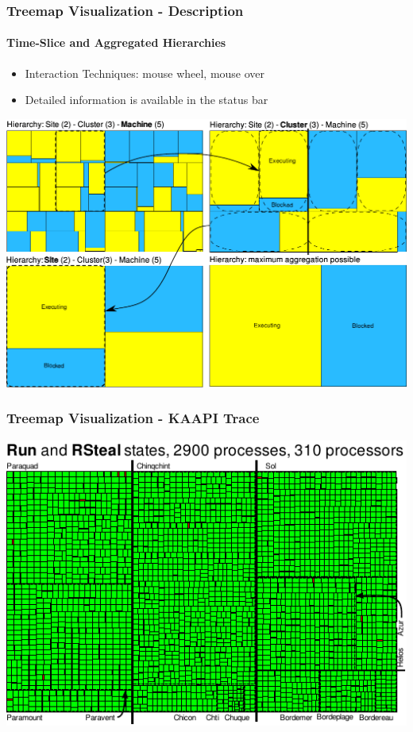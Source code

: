 
%

\frame
{
   \frametitle{Treemap Visualization - Description}
   \framesubtitle{Time-Slice and Aggregated Hierarchies}

   \begin{itemize}
   \item Interaction Techniques: mouse wheel, mouse over
   \item Detailed information is available in the status bar
   \end{itemize}

   \vfill
   \begin{center}
   \includegraphics[width=.8\textwidth]{img/aggregated.pdf}
   \end{center}
}

\frame
{
   \frametitle{Treemap Visualization - KAAPI Trace}


   \includegraphics[width=\textwidth]{img/kaapi-scenario-c.pdf}
}


